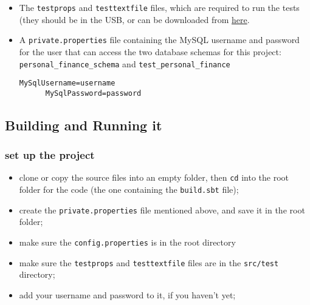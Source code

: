 \begin{itemize}
  \item
    The \texttt{testprops} and \texttt{testtextfile} files, which are required
    to run the tests (they should be in the USB, or can be downloaded from
    \href{https://github.com/claudiusbr/personal_finance_system/tree/master/code/src/test}{here}.

  \item
    A \texttt{private.properties} file containing the MySQL username and password for
    the user that can access the two database schemas for this project:
    \texttt{personal\_finance\_schema} and \texttt{test\_personal\_finance}

    \begin{lstlisting}[frame=single]
      MySqlUsername=username
      MySqlPassword=password
    \end{lstlisting}

\end{itemize}

\subsection{Building and Running it}
\subsubsection{set up the project}
\begin{itemize}
  \item
    clone or copy the source files into an empty folder, then \texttt{cd} into
    the root folder for the code (the one containing the \texttt{build.sbt} file);

  \item
    create the \texttt{private.properties} file mentioned above, and save it in
    the root folder;

  \item
    make sure the \texttt{config.properties} is in the root directory

  \item
    make sure the \texttt{testprops} and \texttt{testtextfile} files are in the
    \texttt{src/test} directory;

  \item
    add your username and password to it, if you haven't yet;
\end{itemize}


